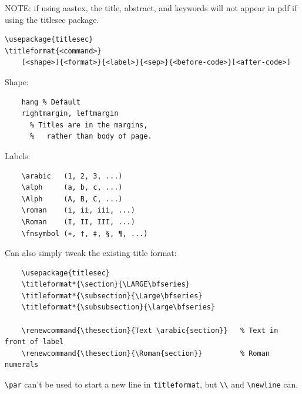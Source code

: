 \documentclass{article}
\begin{document}
NOTE: if using aastex, the title, abstract, and keywords will not appear in
pdf if using the titlesec package.
\begin{lstlisting}
\usepackage{titlesec}
\titleformat{<command>}
    [<shape>]{<format>}{<label>}{<sep>}{<before-code>}[<after-code>]
\end{lstlisting}

\begin{minipage}{0.5\textwidth}
Shape:
\begin{lstlisting}
    hang % Default
    rightmargin, leftmargin
      % Titles are in the margins,
      %   rather than body of page.
\end{lstlisting}
\end{minipage}%
\begin{minipage}{0.5\textwidth}
Labels:
\begin{lstlisting}
    \arabic   (1, 2, 3, ...)
    \alph     (a, b, c, ...)
    \Alph     (A, B, C, ...)
    \roman    (i, ii, iii, ...)
    \Roman    (I, II, III, ...)
    \fnsymbol (∗, †, ‡, §, ¶, ...)
\end{lstlisting}
\end{minipage}

Can also simply tweak the existing title format:
\begin{lstlisting}
    \usepackage{titlesec}
    \titleformat*{\section}{\LARGE\bfseries}
    \titleformat*{\subsection}{\Large\bfseries}
    \titleformat*{\subsubsection}{\large\bfseries}

    \renewcommand{\thesection}{Text \arabic{section}}   % Text in front of label
    \renewcommand{\thesection}{\Roman{section}}         % Roman numerals
\end{lstlisting}

\verb|\par| can't be used to start a new line in \verb|titleformat|, but
\verb|\\| and
\verb|\newline| can.
\end{document}
